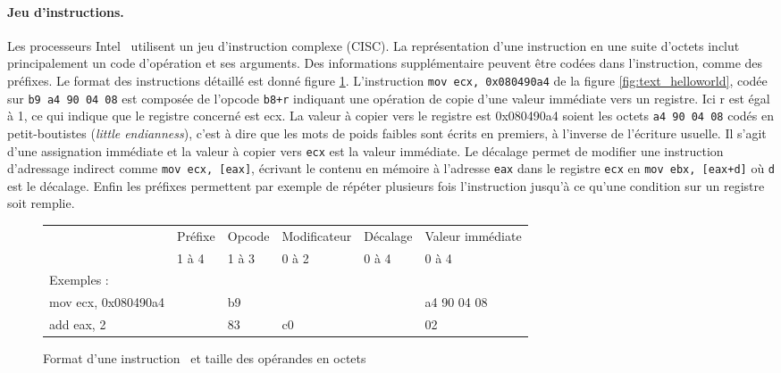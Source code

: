 \paragraph{Jeu d'instructions.}
Les processeurs Intel \xq\ utilisent un jeu d'instruction complexe (CISC). La représentation d'une instruction en une suite d'octets inclut principalement un code d'opération et ses arguments. Des informations supplémentaire peuvent être codées dans l'instruction, comme des préfixes. Le format des instructions détaillé est donné figure \ref{fig:format_insts_x86}.
L'instruction \texttt{mov ecx, 0x080490a4} de la figure \ref{fig:text_helloworld}, codée sur \texttt{b9 a4 90 04 08} est composée de l'opcode \texttt{b8+r} indiquant une opération de copie d'une valeur immédiate vers un registre. Ici r est égal à 1, ce qui indique que le registre concerné est ecx. La valeur à copier vers le registre est 0x080490a4 soient les octets \texttt{a4 90 04 08} codés en petit-boutistes (\emph{little endianness}), c'est à dire que les mots de poids faibles sont écrits en premiers, à l'inverse de l'écriture usuelle.
Il s'agit d'une assignation immédiate et la valeur à copier vers \texttt{ecx} est la valeur immédiate.
Le décalage permet de modifier une instruction d'adressage indirect comme \texttt{mov ecx, [eax]}, écrivant le contenu en mémoire à l'adresse \texttt{eax} dans le registre \texttt{ecx} en \texttt{mov ebx, [eax+d]} où \texttt{d} est le décalage.
Enfin les préfixes permettent par exemple de répéter plusieurs fois l'instruction jusqu'à ce qu'une condition sur un registre soit remplie.

\begin{figure}
\begin{center} 
\begin{tabular}{l|l|l|l|l|l|}
\cline{2-6}
& Préfixe & Opcode & Modificateur & Décalage & Valeur immédiate \\
& 1 à 4 & 1 à 3 & 0 à 2 & 0 à 4 & 0 à 4\\
\cline{2-6}
\multicolumn{1}{l}{Exemples :} & \multicolumn{5}{l}{}\\
\hline
\multicolumn{1}{|l|}{mov ecx, 0x080490a4} & & b9 & & & a4 90 04 08 \\
\multicolumn{1}{|l|}{add eax, 2} & & 83 & c0 & & 02 \\
\hline
\end{tabular}
\end{center} 
\caption{Format d'une instruction \xq\ et taille des opérandes en octets}
\label{fig:format_insts_x86}
\end{figure}

